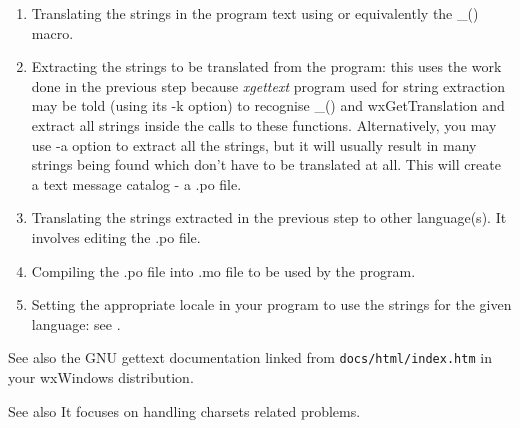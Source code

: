 \begin{enumerate}\itemsep=0pt
\item Translating the strings in the program text using 
 or equivalently the \_() macro.
\item Extracting the strings to be translated from the program: this uses the
work done in the previous step because {\it xgettext} program used for string
extraction may be told (using its -k option) to recognise \_() and
wxGetTranslation and extract all strings inside the calls to these functions.
Alternatively, you may use -a option to extract all the strings, but it will
usually result in many strings being found which don't have to be translated at
all. This will create a text message catalog - a .po file.
\item Translating the strings extracted in the previous step to other
language(s). It involves editing the .po file.
\item Compiling the .po file into .mo file to be used by the program.
\item Setting the appropriate locale in your program to use the strings for the
given language: see .
\end{enumerate}

See also the GNU gettext documentation linked from {\tt docs/html/index.htm} in
your wxWindows distribution.

See also
It focuses on handling charsets related problems.


